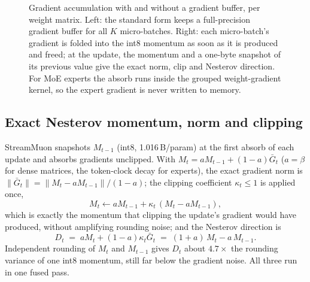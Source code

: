 \documentclass[10pt]{article}
\newcommand{\method}{StreamMuon}\newcommand{\lite}{StreamMuon-Lite}
\begin{document}
\begin{figure}[!t]
\caption{Gradient accumulation with and without a gradient buffer, per weight matrix. Left: the standard form keeps a
full-precision gradient buffer for all $K$ micro-batches. Right: each micro-batch's gradient is folded into the int8 momentum as
soon as it is produced and freed; at the update, the momentum and a one-byte snapshot of its previous value give the
exact norm, clip and Nesterov direction. For MoE experts the absorb runs inside the grouped weight-gradient kernel, so the
expert gradient is never written to memory.}
\label{fig:stream}
\end{figure}


\subsection{Exact Nesterov momentum, norm and clipping}
\label{sec:exact}
\method{} snapshots $M_{t-1}$ (int8, 1.016\,B/param) at the first absorb of each update and absorbs gradients
unclipped. With $M_t=aM_{t-1}+(1-a)\bar G_t$ ($a=\beta$ for dense matrices, the token-clock decay for experts), the exact
gradient norm is $\|\bar G_t\|=\|M_t-aM_{t-1}\|/(1-a)$; the clipping coefficient $\kappa_t\le1$ is applied once,
\begin{equation}
  M_t \leftarrow aM_{t-1}+\kappa_t\,(M_t-aM_{t-1}),
  \label{eq:exactclip}
\end{equation}
which is exactly the momentum that clipping the update's gradient would have produced, without amplifying rounding
noise; and the Nesterov direction is
\begin{equation}
  D_t \;=\; aM_t+(1-a)\kappa_t\bar G_t \;=\; (1+a)\,M_t-a\,M_{t-1}.
  \label{eq:nesterov}
\end{equation}
Independent rounding of $M_t$ and $M_{t-1}$ gives $D_t$ about $4.7\times$ the rounding variance of one int8 momentum,
still far below the gradient noise. All three run in one fused pass.
\end{document}
